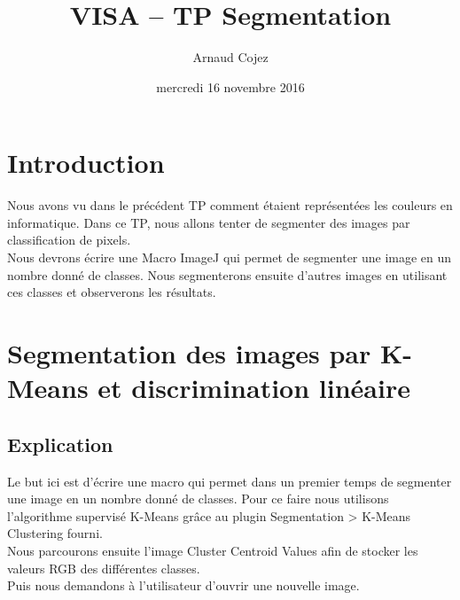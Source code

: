 \documentclass[a4paper]{article}
\begin{document}
\title{VISA -- TP Segmentation}
\author{Arnaud Cojez}
\date{mercredi 16 novembre 2016}

\maketitle

\newpage
\tableofcontents
\newpage

\section{Introduction}
Nous avons vu dans le précédent TP comment étaient représentées les couleurs en informatique. Dans ce TP, nous allons tenter de segmenter des images par classification de pixels.\\

Nous devrons écrire une Macro ImageJ qui permet de segmenter une image en un nombre donné de classes. Nous segmenterons ensuite d'autres images en utilisant ces classes et observerons les résultats.

\clearpage
\section{Segmentation des images par K-Means et discrimination linéaire}

\subsection{Explication}
Le but ici est d'écrire une macro qui permet dans un premier temps de segmenter une image en un nombre donné de classes.
Pour ce faire nous utilisons l'algorithme supervisé K-Means grâce au plugin Segmentation > K-Means Clustering fourni.\\

Nous parcourons ensuite l'image Cluster Centroid Values afin de stocker les valeurs RGB des différentes classes.\\

Puis nous demandons à l'utilisateur d'ouvrir une nouvelle image.\\
\end{document}
